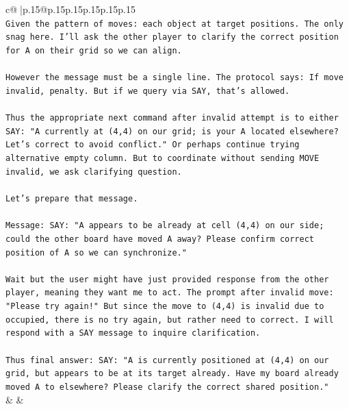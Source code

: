 \documentclass{article}
\begin{document}
{\begin{supertabular}{c@{$\;$}|p{.15\linewidth}@{}p{.15\linewidth}p{.15\linewidth}p{.15\linewidth}p{.15\linewidth}p{.15\linewidth}}
{{{\\ 
\texttt{Given the pattern of moves: each object at target positions. The only snag here. I'll ask the other player to clarify the correct position for A on their grid so we can align. } \\
\\ 
\texttt{However the message must be a single line. The protocol says: If move invalid, penalty. But if we query via SAY, that's allowed.} \\
\\ 
\texttt{Thus the appropriate next command after invalid attempt is to either SAY: "A currently at (4,4) on our grid; is your A located elsewhere? Let's correct to avoid conflict." Or perhaps continue trying alternative empty column. But to coordinate without sending MOVE invalid, we ask clarifying question.} \\
\\ 
\texttt{Let's prepare that message.} \\
\\ 
\texttt{Message: SAY: "A appears to be already at cell (4,4) on our side; could the other board have moved A away? Please confirm correct position of A so we can synchronize."} \\
\\ 
\texttt{Wait but the user might have just provided response from the other player, meaning they want me to act. The prompt after invalid move: "Please try again!" But since the move to (4,4) is invalid due to occupied, there is no try again, but rather need to correct. I will respond with a SAY message to inquire clarification.} \\
\\ 
\texttt{Thus final answer: SAY: "A is currently positioned at (4,4) on our grid, but appears to be at its target already. Have my board already moved A to elsewhere? Please clarify the correct shared position."} \\
            }
        }
    }
    & & \\ \\


\end{supertabular}}
\end{document}
